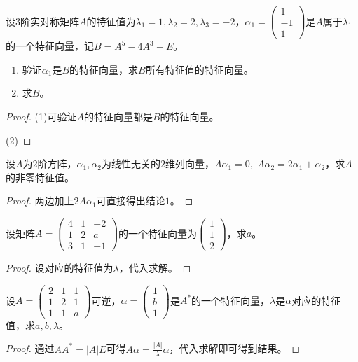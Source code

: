 \begin{theorem}
	设$3$阶实对称矩阵$A$的特征值为$\lambda_1=1,\lambda_2=2,\lambda_3=-2$，$\alpha_1=\begin{pmatrix}
		1 \\
		-1 \\
		1
	\end{pmatrix}$是$A$属于$\lambda_1$的一个特征向量，记$B=A^5-4A^3+E$。
	\begin{enumerate}
		\item 验证$\alpha_1$是$B$的特征向量，求$B$所有特征值的特征向量。
		\item 求$B$。
	\end{enumerate}
\end{theorem}
\begin{proof}
	(1)可验证$A$的特征向量都是$B$的特征向量。\par
	(2)
\end{proof}

\begin{theorem}
	设$A$为$2$阶方阵，$\alpha_1,\alpha_2$为线性无关的$2$维列向量，$A\alpha_1=0,\;A\alpha_2=2\alpha_1+\alpha_2$，求$A$的非零特征值。
\end{theorem}
\begin{proof}
	两边加上$2A\alpha_1$可直接得出结论$1$。
\end{proof}

\begin{theorem}
	设矩阵$A=
	\begin{pmatrix}
		4 & 1 & -2 \\
		1 & 2 & a \\
		3 & 1 & -1 
	\end{pmatrix}$的一个特征向量为$\begin{pmatrix}
	1  \\
	1 \\
	2
	\end{pmatrix}$，求$a$。
\end{theorem}
\begin{proof}
	设对应的特征值为$\lambda$，代入求解。
\end{proof}

\begin{theorem}
	设$A=
	\begin{pmatrix}
		2 & 1 & 1 \\
		1 & 2 & 1 \\
		1 & 1 & a 
	\end{pmatrix}$可逆，$\alpha=\begin{pmatrix}
	1 \\
	b \\
	1
	\end{pmatrix}$是$A^*$的一个特征向量，$\lambda$是$\alpha$对应的特征值，求$a,b,\lambda$。
\end{theorem}
\begin{proof}
	通过$AA^*=|A|E$可得$A\alpha=\frac{|A|}{\lambda}\alpha$，代入求解即可得到结果。
\end{proof}

